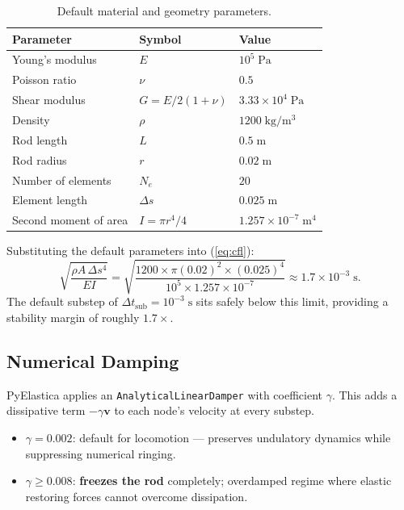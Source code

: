 \documentclass[11pt]{article}
\newcommand{\vect}[1]{\mathbf{#1}}
\newcommand{\dtsub}{\Delta t_{\mathrm{sub}}}
\begin{document}
\begin{table}[H]
\centering
\caption{Default material and geometry parameters.}
\label{tab:params}
\renewcommand{\arraystretch}{1.3}
\begin{tabular}{@{}lll@{}}
\toprule
\textbf{Parameter} & \textbf{Symbol} & \textbf{Value} \\
\midrule
Young's modulus     & $E$           & $10^5\;\mathrm{Pa}$ \\
Poisson ratio       & $\nu$         & $0.5$ \\
Shear modulus       & $G = E/2(1+\nu)$ & $3.33 \times 10^4\;\mathrm{Pa}$ \\
Density             & $\rho$        & $1200\;\mathrm{kg/m^3}$ \\
Rod length          & $L$           & $0.5\;\mathrm{m}$ \\
Rod radius          & $r$           & $0.02\;\mathrm{m}$ \\
Number of elements  & $N_e$         & $20$ \\
Element length      & $\Delta s$    & $0.025\;\mathrm{m}$ \\
Second moment of area & $I = \pi r^4 / 4$ & $1.257 \times 10^{-7}\;\mathrm{m^4}$ \\
\bottomrule
\end{tabular}
\end{table}

Substituting the default parameters into (\ref{eq:cfl}):
\begin{equation}
  \sqrt{\frac{\rho A \, \Delta s^4}{E I}}
  = \sqrt{\frac{1200 \times \pi (0.02)^2 \times (0.025)^4}
               {10^5 \times 1.257 \times 10^{-7}}}
  \approx 1.7 \times 10^{-3}\;\mathrm{s}.
\end{equation}
The default substep of $\dtsub = 10^{-3}\;\mathrm{s}$ sits safely below this
limit, providing a stability margin of roughly $1.7\times$.

\subsection{Numerical Damping}
\label{sec:damping}

PyElastica applies an \texttt{AnalyticalLinearDamper} with coefficient
$\gamma$.  This adds a dissipative term $-\gamma \vect{v}$ to each node's
velocity at every substep.

\begin{itemize}
  \item $\gamma = 0.002$: default for locomotion --- preserves undulatory
        dynamics while suppressing numerical ringing.
  \item $\gamma \geq 0.008$: \textbf{freezes the rod} completely; overdamped
        regime where elastic restoring forces cannot overcome dissipation.
\end{itemize}
\end{document}

